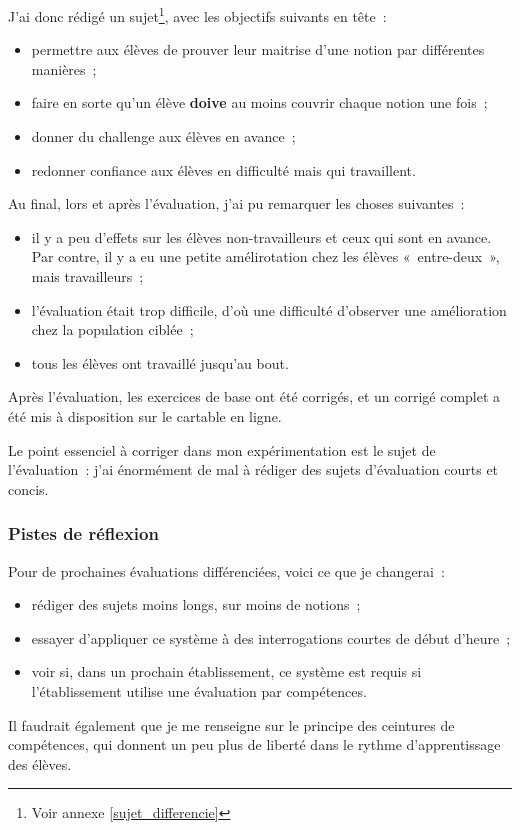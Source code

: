 J'ai donc rédigé un sujet\footnote{Voir annexe \ref{sujet_differencie}}, avec les objectifs suivants
en tête :

\begin{itemize}
    \item permettre aux élèves de prouver leur maitrise d'une notion par différentes manières ;
    \item faire en sorte qu'un élève \textbf{doive} au moins couvrir chaque notion une fois ;
    \item donner du challenge aux élèves en avance ;
    \item redonner confiance aux élèves en difficulté mais qui travaillent.
\end{itemize}

Au final, lors et après l'évaluation, j'ai pu remarquer les choses suivantes :
\begin{itemize}
    \item il y a peu d'effets sur les élèves non-travailleurs et ceux qui sont
    en avance. Par contre, il y a eu une petite amélirotation chez les élèves
    « entre-deux », mais travailleurs ;
    \item l'évaluation était trop difficile, d'où une difficulté d'observer une
    amélioration chez la population ciblée ;
    \item tous les élèves ont travaillé jusqu'au bout.
\end{itemize}

Après l'évaluation, les exercices de base ont été corrigés, et un corrigé complet
a été mis à disposition sur le cartable en ligne.

Le point essenciel à corriger dans mon expérimentation est le sujet de l'évaluation :
j'ai énormément de mal à rédiger des sujets d'évaluation courts et concis.

\subsubsection{Pistes de réflexion}

Pour de prochaines évaluations différenciées, voici ce que je changerai :
\begin{itemize}
    \item rédiger des sujets moins longs, sur moins de notions ;
    \item essayer d'appliquer ce système à des interrogations courtes de début d'heure ;
    \item voir si, dans un prochain établissement, ce système est requis si l'établissement
    utilise une évaluation par compétences.
\end{itemize}

Il faudrait également que je me renseigne sur le principe des ceintures de compétences,
qui donnent un peu plus de liberté dans le rythme d'apprentissage des élèves.
